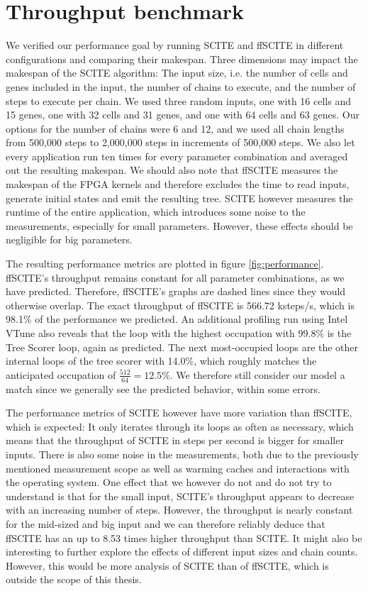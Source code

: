 \section{Throughput benchmark}

We verified our performance goal by running \ac{SCITE} and \ac{ffSCITE} in different configurations and comparing their makespan. Three dimensions may impact the makespan of the \ac{SCITE} algorithm: The input size, i.e. the number of cells and genes included in the input, the number of chains to execute, and the number of steps to execute per chain. We used three random inputs, one with 16 cells and 15 genes, one with 32 cells and 31 genes, and one with 64 cells and 63 genes. Our options for the number of chains were 6 and 12, and we used all chain lengths from 500,000 steps to 2,000,000 steps in increments of 500,000 steps. We also let every application run ten times for every parameter combination and averaged out the resulting makespan. We should also note that \ac{ffSCITE} measures the makespan of the \ac{FPGA} kernels and therefore excludes the time to read inputs, generate initial states and emit the resulting tree. \ac{SCITE} however measures the runtime of the entire application, which introduces some noise to the measurements, especially for small parameters. However, these effects should be negligible for big parameters.

The resulting performance metrics are plotted in figure \ref{fig:performance}. \ac{ffSCITE}'s throughput remains constant for all parameter combinations, as we have predicted. Therefore, \ac{ffSCITE}'s graphs are dashed lines since they would otherwise overlap. The exact throughput of \ac{ffSCITE} is 566.72 ksteps/s, which is 98.1\% of the performance we predicted. An additional profiling run using Intel VTune also reveals that the loop with the highest occupation with 99.8\% is the Tree Scorer loop, again as predicted. The next most-occupied loops are the other internal loops of the tree scorer with 14.0\%, which roughly matches the anticipated occupation of $\frac{512}{64} = 12.5\%$. We therefore still consider our model a match since we generally see the predicted behavior, within some errors.

The performance metrics of \ac{SCITE} however have more variation than \ac{ffSCITE}, which is expected: It only iterates through its loops as often as necessary, which means that the throughput of \ac{SCITE} in steps per second is bigger for smaller inputs. There is also some noise in the measurements, both due to the previously mentioned measurement scope as well as warming caches and interactions with the operating system. One effect that we however do not and do not try to understand is that for the small input, \ac{SCITE}'s throughput appears to decrease with an increasing number of steps. However, the throughput is nearly constant for the mid-sized and big input and we can therefore reliably deduce that \ac{ffSCITE} has an up to 8.53 times higher throughput than \ac{SCITE}. It might also be interesting to further explore the effects of different input sizes and chain counts. However, this would be more analysis of \ac{SCITE} than of \ac{ffSCITE}, which is outside the scope of this thesis.

